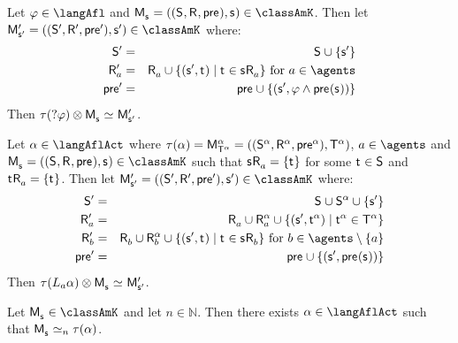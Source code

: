 \begin{lemma}\label{afl-k-construction-test}
Let $\phi \in \langAfl$ and $\aPModel{\aStateS} = \aPModelTuple{\aStateS} \in \classAmK$.
Then let $\aPModelP{\aStateSP} = \aPModelTupleP{\aStateSP} \in \classAmK$ where:
\begin{eqnarray*}
    \aStatesP &=& \aStates \cup \{\aStateSP\}\\
    \aAccessibilityP{\agentA} &=& \aAccessibility{\agentA} \cup \{(\aStateSP, \aStateT) \mid \aStateT \in \aStateS \aAccessibility{\agentA}\} \text{ for } \agentA \in \agents\\
    \aPreconditionP &=& \aPrecondition \cup \{(\aStateSP, \phi \land \aPrecondition(\aStateS))\}
\end{eqnarray*}
Then $\tau(\test{\phi}) \exec \aPModel{\aStateS}  \bisimilar \aPModelP{\aStateSP}$.
\end{lemma}

\begin{lemma}\label{afl-k-construction-learning}
Let $\alpha \in \langAflAct$ where $\tau(\alpha) = \aPModel[\alpha]{\aStatesT[\alpha]} = \aPModelTuple[\alpha]{\aStatesT[\alpha]}$, $\agentA \in \agents$ and $\aPModel{\aStateS} = \aPModelTuple{\aStateS} \in \classAmK$ such that $\aStateS \aAccessibility{\agentA} = \{\aStateT\}$ for some $\aStateT \in \aStates$ and $\aStateT \aAccessibility{\agentA} = \{\aStateT\}$.
Then let $\aPModelP{\aStateSP} = \aPModelTupleP{\aStateSP} \in \classAmK$ where:
\begin{eqnarray*}
    \aStatesP &=& \aStates \cup \aStates[\alpha] \cup \{\aStateSP\}\\
    \aAccessibilityP{\agentA} &=& \aAccessibility{\agentA} \cup \aAccessibility[\alpha]{\agentA} \cup \{(\aStateSP, \aStateT[\alpha]) \mid \aStateT[\alpha] \in \aStatesT[\alpha]\}\\
    \aAccessibilityP{\agentB} &=& \aAccessibility{\agentB} \cup \aAccessibility[\alpha]{\agentB} \cup \{(\aStateSP, \aStateT) \mid \aStateT \in \aStateS \aAccessibility{\agentB}\} \text{ for } \agentB \in \agents \setminus \{\agentA\}\\
    \aPreconditionP &=& \aPrecondition \cup \{(\aStateSP, \aPrecondition(\aStateS))\}
\end{eqnarray*}
Then $\tau(\learns_\agentA \alpha) \exec \aPModel{\aStateS} \bisimilar \aPModelP{\aStateSP}$.
\end{lemma}

\begin{proposition}\label{afl-k-correspondence}
Let $\aPModel{\aStateS} \in \classAmK$ and let $n \in \mathbb{N}$. 
Then there exists $\alpha \in \langAflAct$ such that $\aPModel{\aStateS} \bisimilar[n] \tau(\alpha)$.
\end{proposition}

